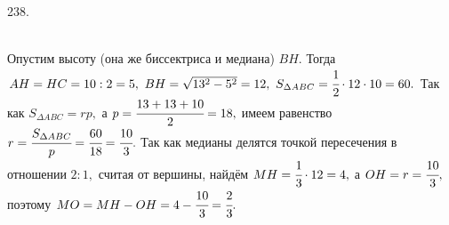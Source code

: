 \documentclass[12pt]{article}
\begin{document}
238. \begin{figure}[ht!]
\end{figure}\\
Опустим высоту (она же биссектриса и медиана) $BH.$ Тогда $AH=HC=10:2=5,\ BH=\sqrt{13^2-5^2}=12,\ S_{\Delta ABC}=\cfrac{1}{2}\cdot12\cdot10=60.$ Так как $S_{\Delta ABC}=rp,$ а $p=\cfrac{13+13+10}{2}=18,$ имеем равенство $r=\cfrac{S_{\Delta ABC}}{p}=\cfrac{60}{18}=\cfrac{10}{3}.$ Так как медианы делятся точкой пересечения в отношении $2:1,$ считая от вершины, найдём $MH=\cfrac{1}{3}\cdot12=4,$ а $OH=r=\cfrac{10}{3},$ поэтому $MO=MH-OH=4-\cfrac{10}{3}=\cfrac{2}{3}.$\\
\end{document}
